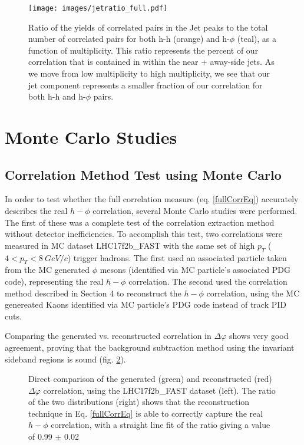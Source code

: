 \documentclass[ALICE,manyauthors]{ALICE_analysis_notes}
\begin{document}
\begin{itemize}
\begin{figure}[ht]
\centering
\texttt{[image: images/jetratio\_full.pdf]}
\caption{Ratio of the yields of correlated pairs in the Jet peaks to the total number of correlated pairs for both h-h (orange) and h-$\phi$ (teal), as a function of multiplicity.  This ratio represents the percent of our correlation that is contained in within the near + away-side jets. As we move from low multiplicity to high multiplicity, we see that our jet component represents a smaller fraction of our correlation for both h-h and h-$\phi$ pairs.}
\label{jetratiofull}
\end{figure}

\section{Monte Carlo Studies}

\subsection{Correlation Method Test using Monte Carlo}

In order to test whether the full correlation measure (eq. \ref{fullCorrEq}) accurately describes the real $h-\phi$ correlation, several Monte Carlo studies were performed.  The first of these was a complete test of the correlation extraction method without detector inefficiencies.  To accomplish this test, two correlations were measured in MC dataset LHC17f2b\_FAST with the same set of high $p_T$ ($4 < p_T < \SI{8}{GeV/c}$) trigger hadrons.  The first used an associated particle taken from the MC generated $\phi$ mesons (identified via MC particle's associated PDG code), representing the real $h-\phi$ correlation. The second used the correlation method described in Section 4 to reconstruct the $h-\phi$ correlation, using the MC genereated Kaons identified via MC particle's PDG code instead of track PID cuts.

Comparing the generated vs. reconstructed correlation in $\Delta\varphi$ shows very good agreement, proving that the background subtraction method using the invariant sideband regions is sound (fig. \ref{methodtestFAST}).

\begin{figure}[ht]
\centering
\begin{subfigure}{
\texttt{[image: images/truevsmethod.pdf]}}
\end{subfigure}
\begin{subfigure}{
\texttt{[image: images/ratio\_method-true\_fit.pdf]}}
\end{subfigure}
\caption{Direct comparison of the generated (green) and reconstructed (red) $\Delta\varphi$ correlation, using the LHC17f2b\_FAST dataset (left). The ratio of the two distributions (right) shows that the reconstruction technique in Eq. \ref{fullCorrEq} is able to correctly capture the real $h-\phi$ correlation, with a straight line fit of the ratio giving a value of 0.99 $\pm$ 0.02}
\label{methodtestFAST}
\end{figure}


\end{itemize}
\end{document}
